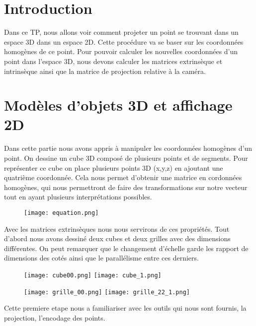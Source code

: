 \documentclass[a4paper,12pt]{report}
\begin{document}


\setcounter{page}{1} 
\newpage

\section*{Introduction}
Dans ce TP, nous allons voir comment projeter un point se trouvant dans un espace 3D dans un espace 2D. Cette procédure va se baser sur les coordonnées homogènes de ce point. Pour pouvoir calculer les nouvelles coordonnées d’un point dans l’espace 3D, nous devons calculer les matrices extrinsèque et intrinsèque ainsi que la matrice de projection relative à la caméra. 




\section*{Modèles d'objets 3D et affichage 2D}
Dans cette partie nous avons appris à manipuler les coordonnées homogènes d’un point. On dessine un cube 3D composé de plusieurs points et de segments. Pour représenter ce cube on place plusieurs points 3D (x,y,z) en ajoutant une quatrième coordonnée. Cela nous permet d’obtenir une matrice en cordonnées homogènes, qui nous permettront de faire des transformations sur notre vecteur tout en ayant plusieurs interprétations possibles.

\begin{figure}[!ht]
	\center
	\texttt{[image: equation.png]}
\end{figure}

Avec les matrices extrinsèques nous nous servirons de ces propriétés.
Tout d’abord nous avons dessiné deux cubes et deux grilles avec des dimensions différentes. On peut remarquer que le changement d’échelle garde les rapport de dimensions des cotés ainsi que le parallélisme entre ces derniers.
\begin{center}
\begin{figure}[!ht]
\center
	\texttt{[image: cube00.png]}
	\texttt{[image: cube\_1.png]}
\end{figure}
\begin{figure}[!ht]
\center
	\texttt{[image: grille\_00.png]}
	\texttt{[image: grille\_22\_1.png]}
\end{figure}

\end{center}

Cette premiere etape nous a familiariser avec les outils qui nous sont fournis, la projection, l’encodage des points.
\end{document}
